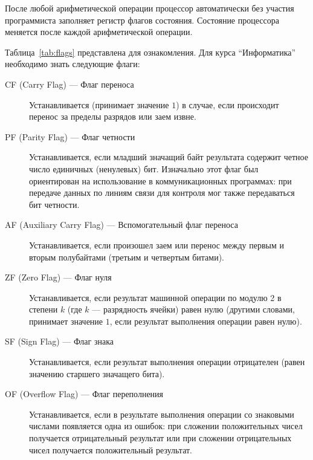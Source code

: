 После любой арифметической операции процессор автоматически без участия программиста заполняет регистр флагов состояния. Состояние процессора меняется после каждой арифметической операции.

Таблица~\ref{tab:flags} представлена для ознакомления. Для курса \enquote{Информатика} необходимо знать следующие флаги:

\begin{description}
    \item [CF (Carry Flag) --- Флаг переноса]
          Устанавливается (принимает значение $1$) в случае, если происходит перенос за пределы разрядов или заем извне.
    \item [PF (Parity Flag) --- Флаг четности]
          Устанавливается, если младший значащий байт результата содержит четное число единичных (ненулевых) бит. Изначально этот флаг был ориентирован на использование в коммуникационных программах: при передаче данных по линиям связи для контроля мог также передаваться бит четности.
    \item [AF (Auxiliary Carry Flag) --- Вспомогательный флаг переноса]
          Устанавливается, если произошел заем или перенос между первым и вторым полубайтами (третьим и четвертым битами).
    \item [ZF (Zero Flag) --- Флаг нуля]
          Устанавливается, если результат машинной операции по модулю 2 в степени $k$ (где $k$ --- разрядность ячейки) равен нулю (другими словами, принимает значение $1$, если результат выполнения операции равен нулю).
    \item [SF (Sign Flag) --- Флаг знака]
          Устанавливается, если результат выполнения операции отрицателен (равен значению старшего значащего бита).
    \item [OF (Overflow Flag) --- Флаг переполнения]
          Устанавливается, если в результате выполнения операции со знаковыми числами появляется одна из ошибок: при сложении положительных чисел получается отрицательный результат или при сложении отрицательных чисел получается положительный результат.
\end{description}

